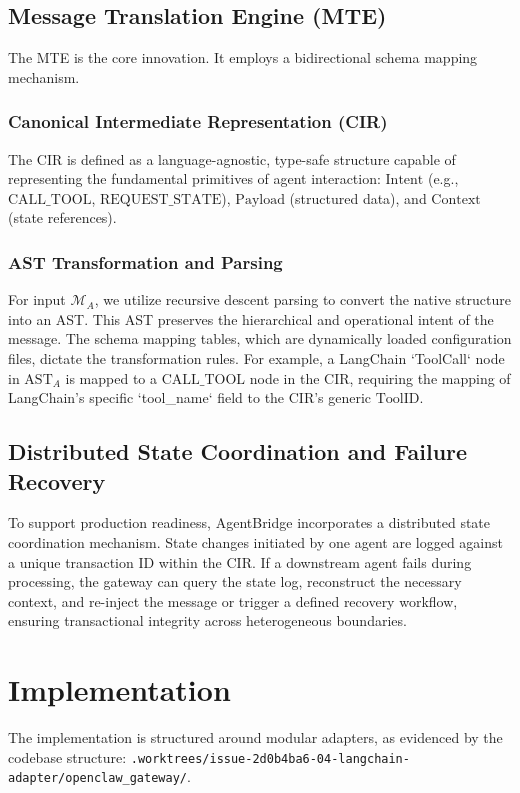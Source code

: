 \documentclass[11pt,a4paper]{article}
\begin{document}
\subsection{Message Translation Engine (MTE)}
The MTE is the core innovation. It employs a bidirectional schema mapping mechanism.

\subsubsection{Canonical Intermediate Representation (CIR)}
The CIR is defined as a language-agnostic, type-safe structure capable of representing the fundamental primitives of agent interaction: $\text{Intent}$ (e.g., $\text{CALL\_TOOL}$, $\text{REQUEST\_STATE}$), $\text{Payload}$ (structured data), and $\text{Context}$ (state references).

\subsubsection{AST Transformation and Parsing}
For input $\mathcal{M}_A$, we utilize recursive descent parsing to convert the native structure into an AST. This AST preserves the hierarchical and operational intent of the message. The schema mapping tables, which are dynamically loaded configuration files, dictate the transformation rules. For example, a LangChain `ToolCall` node in $\text{AST}_A$ is mapped to a $\text{CALL\_TOOL}$ node in the CIR, requiring the mapping of LangChain's specific `tool_name` field to the CIR's generic $\text{ToolID}$.

\subsection{Distributed State Coordination and Failure Recovery}
To support production readiness, AgentBridge incorporates a distributed state coordination mechanism. State changes initiated by one agent are logged against a unique transaction ID within the CIR. If a downstream agent fails during processing, the gateway can query the state log, reconstruct the necessary context, and re-inject the message or trigger a defined recovery workflow, ensuring transactional integrity across heterogeneous boundaries.

\section{Implementation}
The implementation is structured around modular adapters, as evidenced by the codebase structure: \texttt{.worktrees/issue-2d0b4ba6-04-langchain-adapter/openclaw_gateway/}.
\end{document}

